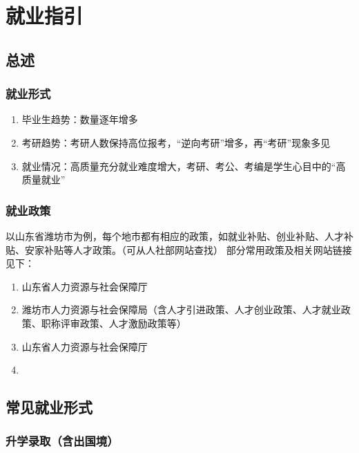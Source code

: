 \chapter[就业指引]{就业指引\footnotemark}

\section[总述]{总述}
\subsection[就业形式]{就业形式}
\begin{enumerate}
    \item 毕业生趋势：数量逐年增多
    \item 考研趋势：考研人数保持高位报考，“逆向考研”增多，再“考研”现象多见
    \item 就业情况：高质量充分就业难度增大，考研、考公、考编是学生心目中的“高质量就业”
\end{enumerate}

\subsection[就业政策]{就业政策}
以山东省潍坊市为例，每个地市都有相应的政策，如就业补贴、创业补贴、人才补贴、安家补贴等人才政策。（可从人社部网站查找）
\bigbreak
部分常用政策及相关网站链接见下：
\begin{enumerate}
    \item 山东省人力资源与社会保障厅
    \item 潍坊市人力资源与社会保障局（含人才引进政策、人才创业政策、人才就业政策、职称评审政策、人才激励政策等）
    \item 山东省人力资源与社会保障厅
    \item {}
\end{enumerate}

\section[常见就业形式]{常见就业形式}
\subsection[升学录取（含出国境）]{升学录取（含出国境）}
